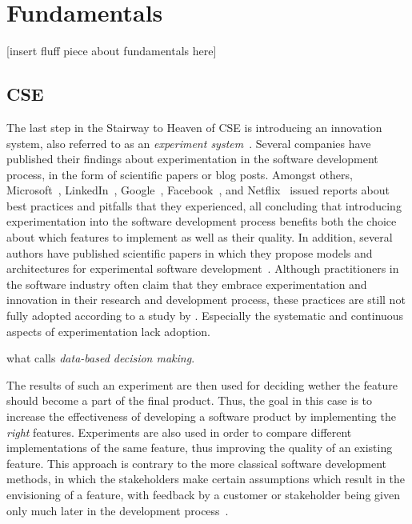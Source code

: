 %
\chapter{Fundamentals}
\label{ch:fundamentals}

[insert fluff piece about fundamentals here]

\section{\acf{CSE}}
\label{sec:fundamentals:edsd}

The last step in the Stairway to Heaven of \ac{CSE} is introducing an innovation system, also referred to as an \emph{experiment system}~\cite{Olsson2012}.
Several companies have published their findings about experimentation in the software development process, in the form of scientific papers or blog posts.
Amongst others, Microsoft~\cite{Kohavi2013}, LinkedIn~\cite{Xu2015}, Google~\cite{Tang2010}, Facebook~\cite{Bakshy2014}, and Netflix~\cite{WEB:Netflix:2016} issued reports about best practices and pitfalls that they experienced, all concluding that introducing experimentation into the software development process benefits both the choice about which features to implement as well as their quality.
In addition, several authors have published scientific papers in which they propose models and architectures for experimental software development~\cite{Fagerholm2014,Fagerholm2017,Johanssen2017,Lindgren2015}.
Although practitioners in the software industry often claim that they embrace experimentation and innovation in their research and development process, these practices are still not fully adopted according to a study by \citet{lindgren2015software}.
Especially the systematic and continuous aspects of experimentation lack adoption.

\cite{Olsson2012}
\cite{Bosch2012}
 what \citet{Bosch2012} calls \emph{data-based decision making}.

The results of such an experiment are then used for deciding wether the feature should become a part of the final product.
Thus, the goal in this case is to increase the effectiveness of developing a software product by implementing the \emph{right} features.
Experiments are also used in order to compare different implementations of the same feature, thus improving the quality of an existing feature.
This approach is contrary to the more classical software development methods, in which the stakeholders make certain assumptions which result in the envisioning of a feature, with feedback by a customer or stakeholder being given only much later in the development process~\cite{Bosch2012}.

